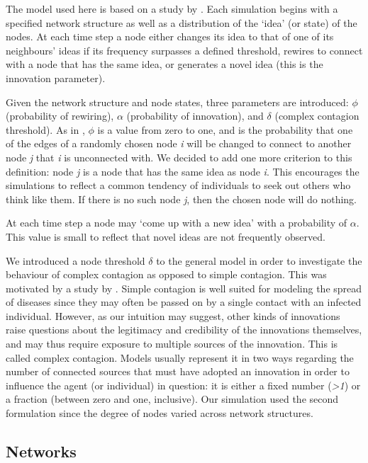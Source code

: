 

The model used here is based on a study by \citet*{HN2006}.  Each simulation begins with a specified network structure as well as a distribution of the `idea' (or state) of the nodes. At each time step a node either changes its idea to that of one of its neighbours' ideas if its frequency surpasses a defined threshold, rewires to connect with a node that has the same idea, or generates a novel idea (this is the innovation parameter). 


Given the network structure and node states, three parameters are introduced: $\phi$ (probability of rewiring), $\alpha$ (probability of innovation), and $\delta$ (complex contagion threshold). As in \citet*{HN2006}, $\phi$ is a value from zero to one, and is the probability that one of the edges of a randomly chosen node \emph{i} will be changed to connect to another node \emph{j} that \emph{i} is unconnected with. We decided to add one more criterion to this definition: node \emph{j} is a node that has the same idea as node \emph{i}. This encourages the simulations to reflect a common tendency of individuals to seek out others who think like them. If there is no such node \emph{j}, then the chosen node will do nothing.


At each time step a node may `come up with a new idea' with a probability of $\alpha$. This value is small to reflect that novel ideas are not frequently observed.


We introduced a node threshold $\delta$ to the general model in order to investigate the behaviour of complex contagion as opposed to simple contagion. This was motivated by a study by \citet*{CM2007}. Simple contagion is well suited for modeling the spread of diseases since they may often be passed on by a single contact with an infected individual. However, as our intuition may suggest, other kinds of innovations raise questions about the legitimacy and credibility of the innovations themselves, and may thus require exposure to multiple sources of the innovation. This is called complex contagion. Models usually represent it in two ways regarding the number of connected sources that must have adopted an innovation in order to influence the agent (or individual) in question: it is either a fixed number (\emph{>1}) or a fraction (between zero and one, inclusive). Our simulation used the second formulation since the degree of nodes varied across network structures.


\subsection{Networks}

